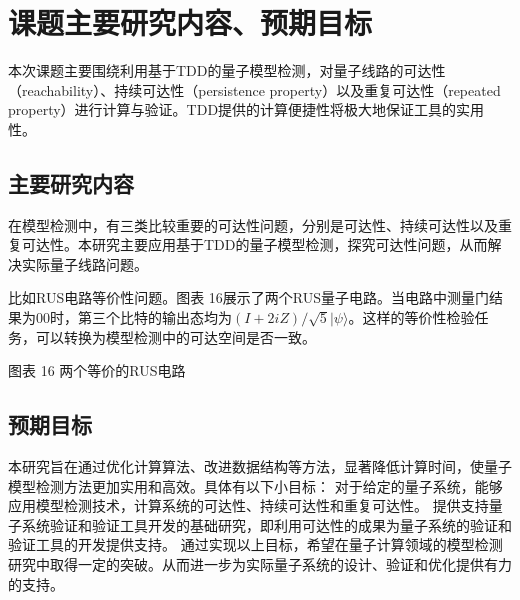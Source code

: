 \section{课题主要研究内容、预期目标}
本次课题主要围绕利用基于TDD的量子模型检测，对量子线路的可达性（reachability）、持续可达性（persistence property）以及重复可达性（repeated property）进行计算与验证。TDD提供的计算便捷性将极大地保证工具的实用性。
\subsection{主要研究内容}
在模型检测中，有三类比较重要的可达性问题，分别是可达性、持续可达性以及重复可达性。本研究主要应用基于TDD的量子模型检测，探究可达性问题，从而解决实际量子线路问题。

比如RUS电路等价性问题。图表 16展示了两个RUS量子电路。当电路中测量门结果为$00$时，第三个比特的输出态均为$\left(I+2iZ\right)/ \sqrt 5 |\psi\rangle$。这样的等价性检验任务，可以转换为模型检测中的可达空间是否一致。
 	 
图表 16 两个等价的RUS电路

\subsection{预期目标}
本研究旨在通过优化计算算法、改进数据结构等方法，显著降低计算时间，使量子模型检测方法更加实用和高效。具体有以下小目标：
	对于给定的量子系统，能够应用模型检测技术，计算系统的可达性、持续可达性和重复可达性。
	提供支持量子系统验证和验证工具开发的基础研究，即利用可达性的成果为量子系统的验证和验证工具的开发提供支持。
通过实现以上目标，希望在量子计算领域的模型检测研究中取得一定的突破。从而进一步为实际量子系统的设计、验证和优化提供有力的支持。
